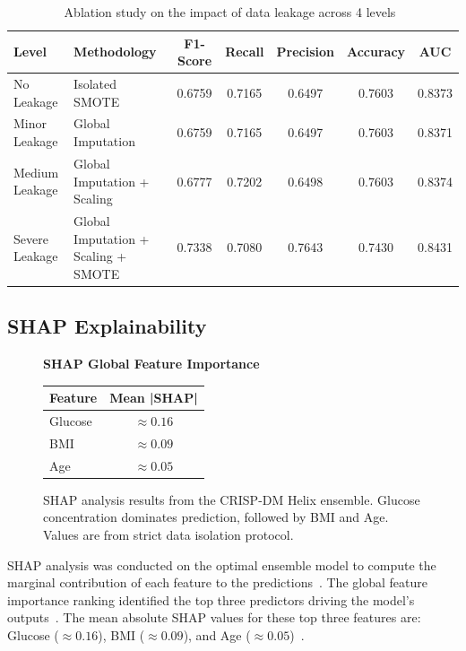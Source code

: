 \documentclass[3p,twocolumn]{elsarticle}
\begin{document}
\begin{table}
\centering
\caption{Ablation study on the impact of data leakage across 4 levels~\cite{Kapoor2024Leakage}}
\label{tab:ablation_study}
\begin{tabular}{llccccc}
\toprule
\textbf{Level} & \textbf{Methodology} & \textbf{F1-Score} & \textbf{Recall} & \textbf{Precision} & \textbf{Accuracy} & \textbf{AUC} \\
\midrule
No Leakage & Isolated SMOTE & 0.6759 & 0.7165 & 0.6497 & 0.7603 & 0.8373 \\
Minor Leakage & Global Imputation & 0.6759 & 0.7165 & 0.6497 & 0.7603 & 0.8371 \\
Medium Leakage & Global Imputation + Scaling & 0.6777 & 0.7202 & 0.6498 & 0.7603 & 0.8374 \\
Severe Leakage & Global Imputation + Scaling + SMOTE & 0.7338 & 0.7080 & 0.7643 & 0.7430 & 0.8431 \\
\bottomrule
\end{tabular}
\end{table}

\subsection{SHAP Explainability}

\begin{figure}[t]
\centering
\begin{minipage}{0.95\columnwidth}
\centering
\textbf{SHAP Global Feature Importance}
\begin{tabular}{lc}
\hline
\textbf{Feature} & \textbf{Mean |SHAP|} \\
\hline
Glucose & $\approx 0.16$ \\
BMI & $\approx 0.09$ \\
Age & $\approx 0.05$ \\
\hline
\end{tabular}
\end{minipage}
\caption{SHAP analysis results from the CRISP-DM Helix ensemble. Glucose concentration dominates prediction, followed by BMI and Age. Values are from strict data isolation protocol.}
\label{fig:shap}
\end{figure}

SHAP analysis was conducted on the optimal ensemble model to compute the marginal contribution of each feature to the predictions~\cite{Kapoor2024Leakage}. The global feature importance ranking identified the top three predictors driving the model's outputs~\cite{Kapoor2024Leakage}. The mean absolute SHAP values for these top three features are: Glucose ($\approx 0.16$), BMI ($\approx 0.09$), and Age ($\approx 0.05$)~\cite{Kapoor2024Leakage}.
\end{document}
